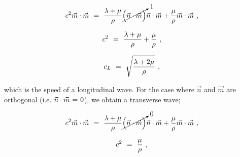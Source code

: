 \documentclass{article}
\begin{document}
\begin{equation} \label{eb-eq-1-175}
c^2 \vec{m} \cdot \vec{m} \hspace{0.125cm} = \hspace{0.125cm} \frac{\lambda + \mu}{\rho} \cancelto{1}{\Big( \vec{n} \cdot \vec{m} \Big)} \vec{n} \cdot \vec{m} + \frac{\mu}{\rho} \vec{m} \cdot \vec{m} \hspace{0.125cm}  ,
\end{equation}

\begin{equation} \label{eb-eq-1-176}
c^2  \hspace{0.125cm} = \hspace{0.125cm} \frac{\lambda + \mu}{\rho} + \frac{\mu}{\rho} \hspace{0.125cm}  ,
\end{equation}

\begin{equation} \label{eb-eq-1-177}
c_L  \hspace{0.125cm} = \hspace{0.125cm} \sqrt{\frac{\lambda + 2 \mu}{\rho}} \hspace{0.125cm}  ,
\end{equation}

which is the speed of a longitudinal wave. For the case where \begin{math} \vec{n} \end{math} and \begin{math} \vec{m} \end{math} are orthogonal (i.e.  \begin{math} \vec{n} \cdot \vec{m} \hspace{0.025cm} = \hspace{0.025cm} 0 \end{math}), we obtain a transverse wave;

\begin{equation} \label{eb-eq-1-178}
c^2 \vec{m} \cdot \vec{m} \hspace{0.125cm} = \hspace{0.125cm} \frac{\lambda + \mu}{\rho} \cancelto{0}{\Big( \vec{n} \cdot \vec{m} \Big)} \vec{n} \cdot \vec{m} + \frac{\mu}{\rho} \vec{m} \cdot \vec{m} \hspace{0.125cm}  ,
\end{equation}

\begin{equation} \label{eb-eq-1-179}
c^2  \hspace{0.125cm} = \hspace{0.125cm} \frac{\mu}{\rho} \hspace{0.125cm}  ,
\end{equation}
\end{document}
